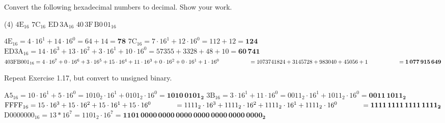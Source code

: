 \exercise %
Convert the following hexadecimal numbers to decimal. Show your work.
\begin{tasks}(4)
	\task $\mathrm{4E_{16}}$
	\task $\mathrm{7C_{16}}$
	\task $\mathrm{ED\,3A_{16}}$
	\task $\mathrm{40\,3F\,B0\,01_{16}}$
\end{tasks}
\solution
\begin{tasks}
	\task $\mathrm{4E}_{16} = 4\cdot 16^1 + 14\cdot 16^0 = 64 + 14 = \mathbf{78}$
	\task $\mathrm{7C}_{16} = 7\cdot 16^1 + 12\cdot 16^0 = 112 + 12 = \mathbf{124}$
	\task $\mathrm{ED3A}_{16} = 14\cdot 16^3 + 13\cdot 16^2 + 3\cdot 16^1
	+ 10 \cdot 16^0 = 57355 + 3328 + 48 + 10 = \mathbf{60\,741}$
	\task $\mathrm{403FB001}_{16} = 4\cdot 16^7 + 0\cdot 16^6 + 3\cdot 16^5
	+ 15\cdot 16^4 + 11\cdot 16^3 + 0\cdot 16^2 + 0\cdot 16^1 + 1\cdot 16^0\\
	\phantom{\mathrm{403FB001}_{16}}
	= 1073741824 + 3145728 + 983040 + 45056 + 1 \\
	\phantom{\mathrm{403FB001}_{16}} = \mathbf{1\,077\,915\,649}$
\end{tasks}

\exercise
Repeat Exercise 1.17, but convert to unsigned binary.
\solution
\begin{tasks}
	\task $\mathrm{A5}_{16} = 10\cdot 16^1 + 5\cdot 16^0 = 1010_2 \cdot 16^1 + 
	0101_2\cdot 16^0 = \mathbf{1010\,0101_2}$
	\task $\mathrm{3B}_{16} = 3\cdot 16^1 + 11\cdot 16^0 = 0011_2 \cdot 16^1 +
	1011_2 \cdot 16^0 = \mathbf{0011\,1011_2}$
	\task $\mathrm{FFFF}_{16} = 15\cdot 16^3 + 15\cdot 16^2 + 15\cdot 16^1 +
	15 \cdot 16^0 \\
	\phantom{\mathrm{FFFF}_{16}} = 1111_2 \cdot 16^3 + 1111_2 \cdot 16^2 + 
	1111_2 \cdot 16^1 + 1111_2 \cdot 16^0 \\
	\phantom{\mathrm{FFFF}_{16}} = \mathbf{1111\,1111\,1111\,1111_2}$
	\task $\mathrm{D0000000}_{16} = 13*16^7 = 1101_2 \cdot 16^7 = 
	\mathbf{1101\,0000\,0000\,0000\,0000\,0000\,0000\,0000_2}$
\end{tasks}

